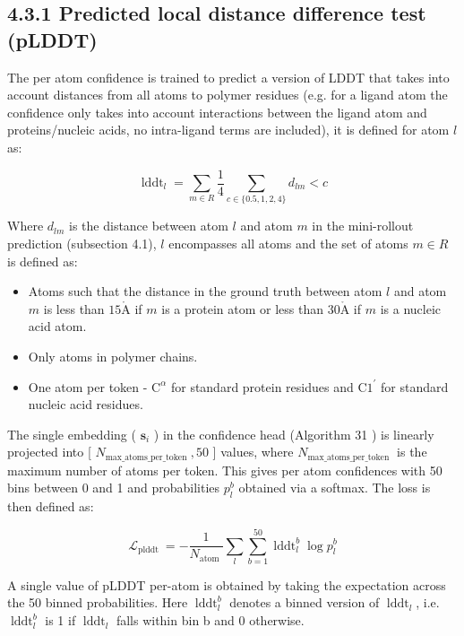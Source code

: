 \documentclass[10pt]{article}
\def\AA{\mathring{\mathrm{A}}}
\begin{document}
\subsection*{4.3.1 Predicted local distance difference test (pLDDT)}
The per atom confidence is trained to predict a version of LDDT that takes into account distances from all atoms to polymer residues (e.g. for a ligand atom the confidence only takes into account interactions between the ligand atom and proteins/nucleic acids, no intra-ligand terms are included), it is defined for atom $l$ as:


\begin{equation*}
\operatorname{lddt}_{l}=\sum_{m \in R} \frac{1}{4} \sum_{c \in\{0.5,1,2,4\}} d_{l m}<c \tag{8}
\end{equation*}


Where $d_{l m}$ is the distance between atom $l$ and atom $m$ in the mini-rollout prediction (subsection 4.1), $l$ encompasses all atoms and the set of atoms $m \in R$ is defined as:

\begin{itemize}
  \item Atoms such that the distance in the ground truth between atom $l$ and atom $m$ is less than $15 \AA$ if $m$ is a protein atom or less than $30 \AA$ if $m$ is a nucleic acid atom.
  \item Only atoms in polymer chains.
  \item One atom per token - $\mathrm{C}^{\alpha}$ for standard protein residues and $\mathrm{C1}^{\prime}$ for standard nucleic acid residues.
\end{itemize}

The single embedding ( $\mathbf{s}_{i}$ ) in the confidence head (Algorithm 31 ) is linearly projected into [ $N_{\text {max_atoms_per_token }}, 50$ ] values, where $N_{\text {max_atoms_per_token }}$ is the maximum number of atoms per token. This gives per atom confidences with 50 bins between 0 and 1 and probabilities $p_{l}^{b}$ obtained via a softmax. The loss is then defined as:


\begin{equation*}
\mathcal{L}_{\text {plddt }}=-\frac{1}{N_{\text {atom }}} \sum_{l} \sum_{b=1}^{50} \operatorname{lddt}_{l}^{b} \log p_{l}^{b} \tag{9}
\end{equation*}


A single value of pLDDT per-atom is obtained by taking the expectation across the 50 binned probabilities. Here $\operatorname{lddt}_{l}^{b}$ denotes a binned version of $\operatorname{lddt}_{l}$, i.e. $\operatorname{lddt}_{l}^{b}$ is 1 if $\operatorname{lddt}_{l}$ falls within bin b and 0 otherwise.
\end{document}
